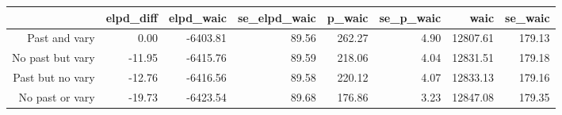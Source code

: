 \begin{table}[ht]
\centering
\begin{tabular}{rrrrrrrr}
  \hline
 & elpd\_diff & elpd\_waic & se\_elpd\_waic & p\_waic & se\_p\_waic & waic & se\_waic \\ 
  \hline
Past and vary & 0.00 & -6403.81 & 89.56 & 262.27 & 4.90 & 12807.61 & 179.13 \\ 
  No past but vary & -11.95 & -6415.76 & 89.59 & 218.06 & 4.04 & 12831.51 & 179.18 \\ 
  Past but no vary & -12.76 & -6416.56 & 89.58 & 220.12 & 4.07 & 12833.13 & 179.16 \\ 
  No past or vary & -19.73 & -6423.54 & 89.68 & 176.86 & 3.23 & 12847.08 & 179.35 \\ 
   \hline
\end{tabular}
\end{table}
